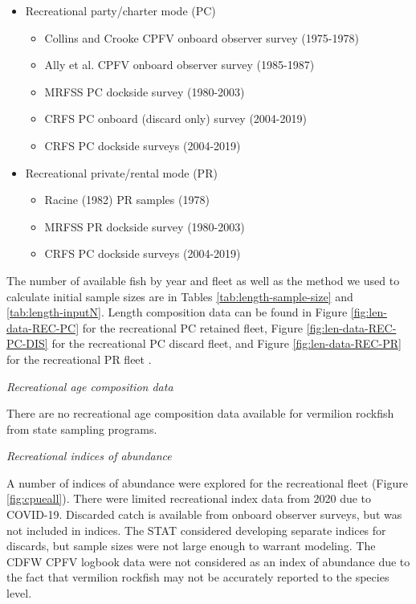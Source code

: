 \documentclass[
  english,
  a4paper,
]{article}
\begin{document}
\begin{itemize}
 \item Recreational party/charter mode (PC)
   \begin{itemize}
    \item Collins and Crooke CPFV onboard observer survey (1975-1978)  
    \item Ally  et al. CPFV onboard observer survey (1985-1987)
    \item MRFSS PC dockside survey (1980-2003)     
    \item CRFS PC onboard (discard only) survey (2004-2019)
    \item CRFS PC dockside surveys (2004-2019)
  \end{itemize}
 \item Recreational private/rental mode (PR)
   \begin{itemize}
    \item Racine (1982) PR samples (1978)
    \item MRFSS PR dockside survey (1980-2003) 
    \item CRFS PC dockside surveys (2004-2019)
   \end{itemize}
\end{itemize}

The number of available fish by year and fleet as well as the method we used to
calculate initial sample sizes are in Tables \ref{tab:length-sample-size} and \ref{tab:length-inputN}.
Length composition data can be found in Figure
\ref{fig:len-data-REC-PC} for the recreational PC retained fleet, Figure \ref{fig:len-data-REC-PC-DIS} for
the recreational PC discard fleet, and Figure \ref{fig:len-data-REC-PR} for the recreational PR fleet
.

\emph{Recreational age composition data}

There are no recreational age composition data available for vermilion rockfish from state sampling
programs.

\emph{Recreational indices of abundance}

A number of indices of abundance were explored for the recreational fleet (Figure \ref{fig:cpueall}). There were limited recreational index data from 2020 due to COVID-19. Discarded catch is available from onboard observer surveys, but was not included in indices. The STAT considered developing separate indices for discards, but sample sizes were not large enough to warrant modeling. The CDFW CPFV logbook data were not considered as an index of abundance due to the fact that
vermilion rockfish may not be accurately reported to the species level.
\end{document}
